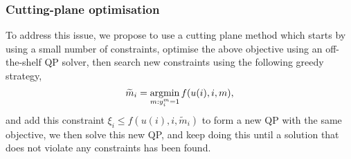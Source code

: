 \subsubsection{Cutting-plane optimisation}

To address this issue, we propose to use a cutting plane method which starts by using a small number of constraints,
optimise the above objective using an off-the-shelf QP solver,
then search new constraints using the following greedy strategy,
\begin{equation*}
\widetilde m_i = \operatorname*{argmin}_{m: y_i^m = 1} f(u(i), i, m),
\end{equation*}
and add this constraint $\xi_i \le f(u(i), i, \widetilde m_i)$ to form a new QP with the same objective,
we then solve this new QP, and keep doing this until a solution that does not violate any constraints has been found.
